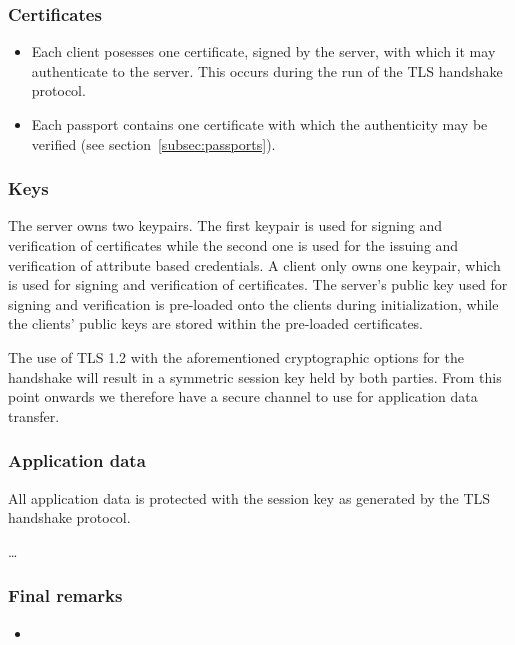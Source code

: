 \subsubsection{Certificates}
\begin{itemize}
	\item Each client posesses one certificate, signed by the server, with which it may authenticate to the server. This occurs during the run of the TLS handshake protocol.
  \item Each passport contains one certificate with which the authenticity may be verified (see section~\ref{subsec:passports}).
\end{itemize}

\subsubsection{Keys}
The server owns two keypairs. The first keypair is used for signing and verification of certificates while the second one is used for the issuing and verification of attribute based credentials. A client only owns one keypair, which is used for signing and verification of certificates. The server's public key used for signing and verification is pre-loaded onto the clients during initialization, while the clients' public keys are stored within the pre-loaded certificates.

The use of TLS 1.2 with the aforementioned cryptographic options for the handshake will result in a symmetric session key held by both parties. From this point onwards we therefore have a secure channel to use for application data transfer.

\subsubsection{Application data}
All application data is protected with the session key as generated by the TLS handshake protocol. 

\ldots


\subsubsection{Final remarks}
\begin{itemize}
  \item 
\end{itemize}


